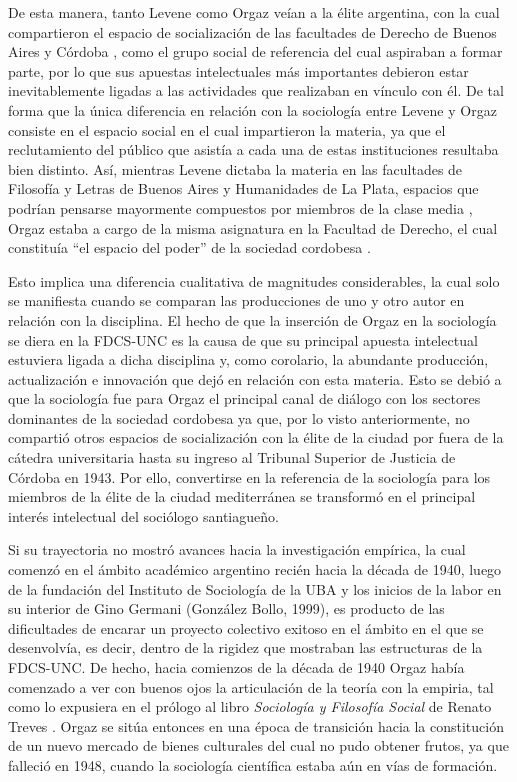 De esta manera, tanto Levene como Orgaz veían a la élite argentina, con la cual compartieron el espacio de socialización de las facultades de Derecho de Buenos Aires y Córdoba \parencite{277-AGUERO2017,1542-ORTIZ2012}, como el grupo social de referencia del cual aspiraban a formar parte, por lo que sus apuestas intelectuales más importantes debieron estar inevitablemente ligadas a las actividades que realizaban en vínculo con él. De tal forma que la única diferencia en relación con la sociología entre Levene y Orgaz consiste en el espacio social en el cual impartieron la materia, ya que el reclutamiento del público que asistía a cada una de estas instituciones resultaba bien distinto. Así, mientras Levene dictaba la materia en las facultades de Filosofía y Letras de Buenos Aires y Humanidades de La Plata, espacios que podrían pensarse mayormente compuestos por miembros de la clase media \parencite{1537-BUCHBINDER1997,1627-FINOCCHIO2001}, Orgaz estaba a cargo de la misma asignatura en la Facultad de Derecho, el cual constituía \enquote{el espacio del poder} de la sociedad cordobesa \parencite[39]{1447-CARACCIOLO2010}.

Esto implica una diferencia cualitativa de magnitudes considerables, la cual solo se manifiesta cuando se comparan las producciones de uno y otro autor en relación con la disciplina. El hecho de que la inserción de Orgaz en la sociología se diera en la FDCS-UNC es la causa de que su principal apuesta intelectual estuviera ligada a dicha disciplina y, como corolario, la abundante producción, actualización e innovación que dejó en relación con esta materia. Esto se debió a que la sociología fue para Orgaz el principal canal de diálogo con los sectores dominantes de la sociedad cordobesa ya que, por lo visto anteriormente, no compartió otros espacios de socialización con la élite de la ciudad por fuera de la cátedra universitaria hasta su ingreso al Tribunal Superior de Justicia de Córdoba en 1943. Por ello, convertirse en la referencia de la sociología para los miembros de la élite de la ciudad mediterránea se transformó en el principal interés intelectual del sociólogo santiagueño.

Si su trayectoria no mostró avances hacia la investigación empírica, la cual comenzó en el ámbito académico argentino recién hacia la década de 1940, luego de la fundación del Instituto de Sociología de la UBA y los inicios de la labor en su interior de Gino Germani (González Bollo, 1999), es producto de las dificultades de encarar un proyecto colectivo exitoso en el ámbito en el que se desenvolvía, es decir, dentro de la rigidez que mostraban las estructuras de la FDCS-UNC. De hecho, hacia comienzos de la década de 1940 Orgaz había comenzado a ver con buenos ojos la articulación de la teoría con la empiria, tal como lo expusiera en el prólogo al libro \emph{Sociología y Filosofía Social} de Renato Treves \parencite{1546-ORGAZ1941}. Orgaz se sitúa entonces en una época de transición hacia la constitución de un nuevo mercado de bienes culturales del cual no pudo obtener frutos, ya que falleció en 1948, cuando la sociología científica estaba aún en vías de formación.

